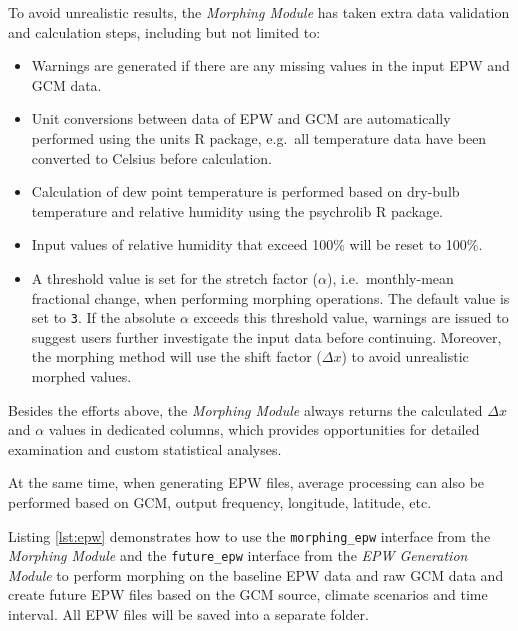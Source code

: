 \documentclass[twocolumn, a4paper,10pt]{article}
\providecommand{\tightlist}{\setlength{\itemsep}{0pt}\setlength{\parskip}{0pt}}
\begin{document}
To avoid unrealistic results, the \emph{Morphing Module} has taken extra data
validation and calculation steps, including but not limited to:

\begin{itemize}
\tightlist
\item
  Warnings are generated if there are any missing values in the input EPW and
  GCM data.
\item
  Unit conversions between data of EPW and GCM are automatically performed using
  the units \citep{pebesma2016measurement} R package, e.g.~all temperature data have
  been converted to Celsius before calculation.
\item
  Calculation of dew point temperature is performed based on dry-bulb
  temperature and relative humidity using the psychrolib \citep{meyer2019psychrolib}
  R package.
\item
  Input values of relative humidity that exceed 100\% will be reset to 100\%.
\item
  A threshold value is set for the stretch factor (\(\alpha\)), i.e.~monthly-mean
  fractional change, when performing morphing operations. The default value is
  set to \texttt{3}. If the absolute \(\alpha\) exceeds this threshold value, warnings
  are issued to suggest users further investigate the input data before
  continuing. Moreover, the morphing method will use the shift factor (\(\Delta x\))
  to avoid unrealistic morphed values.
\end{itemize}

Besides the efforts above, the \emph{Morphing Module} always returns the calculated
\(\Delta x\) and \(\alpha\) values in dedicated columns, which provides
opportunities for detailed examination and custom statistical analyses.

At the same time, when generating EPW files, average processing can also be
performed based on GCM, output frequency, longitude, latitude, etc.

Listing \ref{lst:epw} demonstrates how to use the \texttt{morphing\_epw} interface from
the \emph{Morphing Module} and the \texttt{future\_epw} interface from the \emph{EPW Generation
Module} to perform morphing on the baseline EPW data and raw GCM data and
create future EPW files based on the GCM source, climate scenarios and time
interval. All EPW files will be saved into a separate folder.
\end{document}
